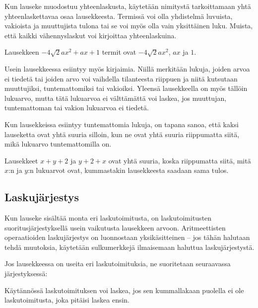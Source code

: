 Kun lauseke muodostuu yhteenlaskusta, käytetään nimitystä  tarkoittamaan yhtä yhteenlaskettavaa osaa lausekkeesta. Termissä voi olla yhdistelmä luvuista, vakioista ja muuttujista tulona tai se voi myös olla vain yksittäinen luku. Muista, että kaikki vähennyslaskut voi kirjoittaa yhteenlaskuina.

\begin{esimerkki}
Lausekkeen $-4\sqrt{2}ax^2+ax+1$ termit ovat $-4\sqrt{2}ax^2$, $ax$ ja $1$.
\end{esimerkki}

Usein lausekkeessa esiintyy myös kirjaimia. Niillä merkitään lukuja, joiden arvoa ei tiedetä tai joiden arvo voi vaihdella tilanteesta riippuen ja niitä kutsutaan muuttujiksi, tuntemattomiksi tai vakioiksi. Yleensä lausekkeella on myös tällöin lukuarvo, mutta tätä lukuarvoa ei välttämättä voi laskea, jos muuttujan, tuntemattoman tai vakion lukuarvoa ei tiedetä.

Kun lausekkeissa esiintyy tuntemattomia lukuja, on tapana sanoa, että kaksi lauseketta ovat yhtä suuria silloin, kun ne ovat yhtä suuria riippumatta siitä, mikä lukuarvo tuntemattomilla on.

\begin{esimerkki}
Lausekkeet $x+y+2$ ja $y+2+x$ ovat yhtä suuria, koska riippumatta siitä, mitä $x$:n ja $y$:n lukuarvot ovat, kummastakin lausekkeesta saadaan sama tulos.
\end{esimerkki}

\subsection{Laskujärjestys}

Kun lauseke sisältää monta eri laskutoimitusta, on laskutoimitusten suoritusjärjestyksellä usein vaikutusta lausekkeen arvoon. Aritmeettisten operaatioiden laskujärjestys on luonnostaan yksikäsitteinen -- jos tähän halutaan tehdä muutoksia, käytetään sulkumerkkejä ilmaisemaan haluttua laskujärjestystä.

Jos lausekkeessa on useita eri laskutoimituksia, ne suoritetaan seuraavassa järjestyksessä:


Käytännössä laskutoimituksen voi laskea, jos sen kummallakaan puolella ei ole laskutoimitusta, joka pitäisi laskea ensin.

